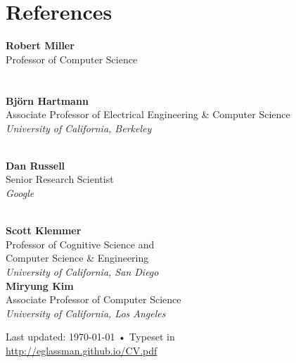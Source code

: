\documentclass[10pt, a4paper]{article}
\begin{document}
\section*{References}
\noindent
\begin{multicols}{2}

\textbf{Robert Miller}\\
Professor of Computer Science
\\
\\\\
\textbf{Bj{\"o}rn Hartmann}\\
Associate Professor of Electrical Engineering \& Computer Science
\\
\emph{University of California, Berkeley}\\\

\textbf{Dan Russell}\\
Senior Research Scientist%
\\
\emph{Google}\\\\

\columnbreak

\textbf{Scott Klemmer}\\
Professor of Cognitive Science and \\Computer Science \& Engineering\\
\emph{University of California, San Diego}\\

\textbf{Miryung Kim}\\
Associate Professor of Computer Science\\
\emph{University of California, Los Angeles}


\end{multicols}
 









\vfill{}

\begin{center}
{\scriptsize  Last updated: \today\- •\- 
Typeset in \href{http://nitens.org/taraborelli/cvtex}{
\XeTeX }\\
\href{http://eglassman.github.io/CV.pdf}{http://eglassman.github.io/CV.pdf}}
\end{center}
\end{document}
